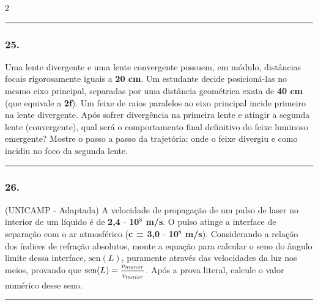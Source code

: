 \documentclass[twoside, 10pt, a4paper]{article}
\newlength{\espacoPreQuestao}\setlength{\espacoPreQuestao}{0.1cm}
\newlength{\espacoQuestao}\setlength{\espacoQuestao}{0.2cm}
\begin{document}
\begin{multicols*}{2}
\noindent\textcolor{CorLinha}{\rule{\linewidth}{0.5pt}} 
\par\vspace{\espacoPreQuestao}
\subsubsection*{25.} Uma lente divergente e uma lente convergente possuem, em módulo, distâncias focais rigorosamente iguais a \textbf{20 cm}. Um estudante decide posicioná-las no mesmo eixo principal, separadas por uma distância geométrica exata de \textbf{40 cm} (que equivale a \textbf{2f}). Um feixe de raios paralelos ao eixo principal incide primeiro na lente divergente. 
Após sofrer divergência na primeira lente e atingir a segunda lente (convergente), qual será o comportamento final definitivo do feixe luminoso emergente? Mostre o passo a passo da trajetória: onde o feixe divergiu e como incidiu no foco da segunda lente.
\par\vspace{\espacoQuestao}

\noindent\textcolor{CorLinha}{\rule{\linewidth}{0.5pt}} 
\par\vspace{\espacoPreQuestao}
\subsubsection*{26.} (UNICAMP - Adaptada) A velocidade de propagação de um pulso de laser no interior de um líquido é de \textbf{2,4 $\cdot$ 10$^8$ m/s}. O pulso atinge a interface de separação com o ar atmosférico (\textbf{c = 3,0 $\cdot$ 10$^8$ m/s}).
Considerando a relação dos índices de refração absolutos, monte a equação para calcular o seno do ângulo limite dessa interface, $ \text{sen}(L) $, puramente através das velocidades da luz nos meios, provando que $ \text{sen}(L) = \mfrac{v_{menor}}{v_{maior}} $. Após a prova literal, calcule o valor numérico desse seno.
\par\vspace{\espacoQuestao}

\noindent\textcolor{CorLinha}{\rule{\linewidth}{0.5pt}} 
\par\vspace{\espacoPreQuestao}

\end{multicols*}
\end{document}
